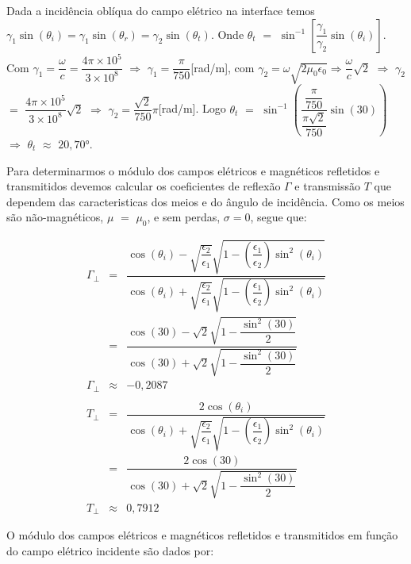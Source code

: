 \begin{enumerate}[1.]
Dada a incidência oblíqua do campo elétrico na interface temos $\gamma_{1}\sin(\theta_i) = \gamma_{1}\sin(\theta_{r}) = \gamma_{2}\sin(\theta_{t})$. Onde $\theta_{t}$ $=$ $\sin^{-1}\left[\dfrac{\gamma_{1}}{\gamma_{2}}\sin(\theta_{i})\right]$. Com $\gamma_{1} = \dfrac{\omega}{c} = \dfrac{4\pi \times 10^{5}}{3 \times 10^{8}}$ $\Rightarrow$ $\gamma_{1} = \dfrac{\pi}{750}$[\si{\radian/\meter}], com $\gamma_{2} = \omega\sqrt{2\mu_{0}\epsilon_{0}} \Rightarrow \dfrac{\omega}{c}\sqrt{2}$ $\Rightarrow$ $\gamma_{2}$ $=$ $\dfrac{4\pi \times 10^{5}}{3\times 10^{8}}\sqrt{2}$ $\Rightarrow$ $\gamma_{2} = \dfrac{\sqrt{2}}{750}\pi$[\si{\radian/\meter}]. Logo $\theta_{t}$ $=$ $\sin^{-1}\left(\dfrac{\dfrac{\pi}{750}}{\dfrac{\pi\sqrt{2}}{750}}\sin(30)\right)$ $\Rightarrow$ $\theta_{t}$ $\approx$ $20,70$\si{\degree}.

Para determinarmos o módulo dos campos elétricos e magnéticos refletidos e transmitidos devemos calcular os coeficientes de reflexão $\Gamma$ e transmissão $T$ que dependem das caracteristicas dos meios e do ângulo de incidência. Como os meios são não-magnéticos, $\mu$ $=$ $\mu_{0}$, e sem perdas, $\sigma = 0$, segue que:

\begin{eqnarray*}
\Gamma_{\perp} & = & \dfrac{\cos(\theta_{i}) - \sqrt{\dfrac{\epsilon_{2}}{\epsilon_{1}}}\sqrt{1 - \left(\dfrac{\epsilon_{1}}{\epsilon_{2}}\right)\sin^{2}(\theta_{i})}}{\cos(\theta_{i}) + \sqrt{\dfrac{\epsilon_{2}}{\epsilon_{1}}}\sqrt{1 - \left(\dfrac{\epsilon_{1}}{\epsilon_{2}}\right)\sin^{2}(\theta_{i})}} \nonumber \\
& = & \dfrac{\cos(30) - \sqrt{2}\sqrt{1 - \dfrac{\sin^{2}(30)}{2}}}{\cos(30) + \sqrt{2}\sqrt{1 - \dfrac{\sin^{2}(30)}{2}}}\nonumber \\
\Gamma_{\perp} & \approx & -0,2087 \nonumber \\
& & \\
T_{\perp} & = &\dfrac{2\cos(\theta_{i})}{\cos(\theta_{i}) + \sqrt{\dfrac{\epsilon_{2}}{\epsilon_{1}}}\sqrt{1 - \left(\dfrac{\epsilon_{1}}{\epsilon_{2}}\right)\sin^{2}(\theta_{i})}} \nonumber \\
& = & \dfrac{2\cos(30)}{\cos(30) + \sqrt{2}\sqrt{1 - \dfrac{\sin^{2}(30)}{2}}}\nonumber \\
T_{\perp} & \approx & 0,7912 \nonumber
\end{eqnarray*}

O módulo dos campos elétricos e magnéticos refletidos e transmitidos em função do campo elétrico incidente são dados por:


\end{enumerate}
